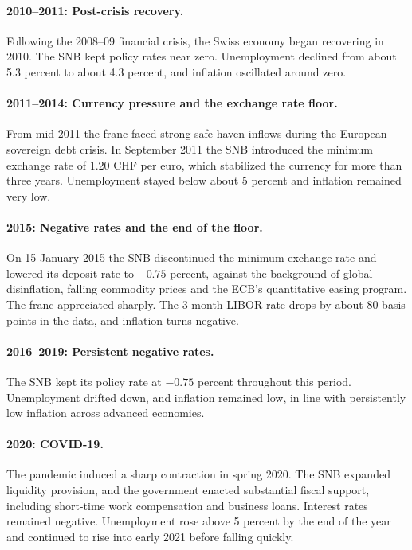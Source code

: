 \documentclass[11pt]{article}
\begin{document}
\paragraph{2010--2011: Post-crisis recovery.} Following the 2008--09 financial crisis, the Swiss economy began recovering in 2010. The SNB kept policy rates near zero. Unemployment declined from about 5.3 percent to about 4.3 percent, and inflation oscillated around zero.

\paragraph{2011--2014: Currency pressure and the exchange rate floor.} From mid-2011 the franc faced strong safe-haven inflows during the European sovereign debt crisis. In September 2011 the SNB introduced the minimum exchange rate of 1.20 CHF per euro, which stabilized the currency for more than three years. Unemployment stayed below about 5 percent and inflation remained very low.

\paragraph{2015: Negative rates and the end of the floor.} On 15 January 2015 the SNB discontinued the minimum exchange rate and lowered its deposit rate to $-0.75$ percent, against the background of global disinflation, falling commodity prices and the ECB's quantitative easing program. The franc appreciated sharply. The 3-month LIBOR rate drops by about 80 basis points in the data, and inflation turns negative.

\paragraph{2016--2019: Persistent negative rates.} The SNB kept its policy rate at $-0.75$ percent throughout this period. Unemployment drifted down, and inflation remained low, in line with persistently low inflation across advanced economies.

\paragraph{2020: COVID-19.} The pandemic induced a sharp contraction in spring 2020. The SNB expanded liquidity provision, and the government enacted substantial fiscal support, including short-time work compensation and business loans. Interest rates remained negative. Unemployment rose above 5 percent by the end of the year and continued to rise into early 2021 before falling quickly.
\end{document}
